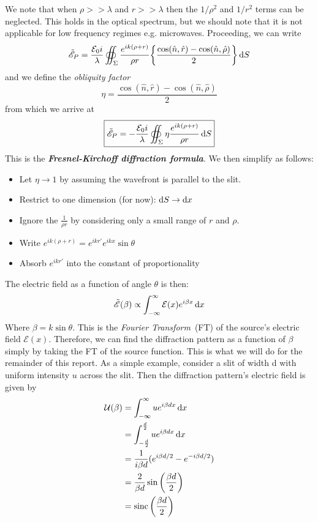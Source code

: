 \documentclass[a4paper,11pt]{article}
\DeclareMathOperator{\sinc}{sinc}
\begin{document}
We note that when $\rho >> \lambda$ and $r >> \lambda$ then the $1/\rho^2$ and $1/r^2$ terms can be neglected. This holds in the optical spectrum, but we should note that it is not applicable for low frequency regimes e.g. microwaves. Proceeding, we can write
\begin{equation}
\tilde{\mathscr{E}}_P = \frac{\mathcal{E}_0i}{\lambda} \displaystyle\oiint_{\Sigma} \frac{e^{ik(\rho+r)}}{\rho r} \bigg\{\frac{\cos(\hat{n},\hat{r})-\cos(\hat{n},\hat{\rho})}{2}\bigg\}\dif S
\end{equation}
and we define the \textit{obliquity factor} 
\begin{equation}
\eta = \frac{\cos(\hat{n},\hat{r})-\cos(\hat{n},\hat{\rho})}{2}
\end{equation}
from which we arrive at 
\begin{equation}
\boxed{\tilde{\mathscr{E}}_P = -\frac{\mathcal{E}_0i}{\lambda} \displaystyle\oiint_{\Sigma} \eta \frac{e^{ik(\rho+r)}}{\rho r} \dif S}
\end{equation}
This is the \textit{\textbf{Fresnel-Kirchoff diffraction formula}}\cite{hecht}. We then simplify as follows:
\begin{itemize}
\item Let $\eta \rightarrow 1$ by assuming the wavefront is parallel to the slit.
\item Restrict to one dimension (for now): $\dif S \rightarrow \dif x$
\item Ignore the $\frac{1}{\rho r}$ by considering only a small range of $r$ and $\rho$.
\item Write $e^{ik(\rho +r)} = e^{ikr'}e^{ikx}\sin\theta$
\item Absorb $e^{ikr'}$ into the constant of proportionality
\end{itemize}
The electric field as a function of angle $\theta$ is then:
\begin{equation}
\tilde{\mathscr{E}}(\beta) \propto \int_{-\infty} ^{\infty} \mathcal{E}(x) e^{i\beta x} \dif x
\end{equation}
Where $\beta = k\sin\theta$.
This is the \textit{Fourier Transform}~(FT) of the source's electric field $\mathcal{E}(x)$. Therefore, we can find the diffraction pattern as a function of $\beta$ simply by taking the FT of the source function. This is what we will do for the remainder of this report. 
As a simple example, consider a slit of width d with uniform intensity $u$ across the slit. Then the diffraction pattern's electric field is given by
\begin{equation*}
\begin{split}
\mathcal{U}(\beta) & = \int_{-\infty}^{\infty} ue^{i\beta dx} \dif x\\
& = \int_{-\frac{d}{2}}^{\frac{d}{2}} ue^{i\beta dx} \dif x \\
& = \frac{1}{i\beta d}(e^{i\beta d/2}-e^{-i\beta d/2})\\
& = \frac{2}{\beta d} \sin\bigg(\frac{\beta d}{2}\bigg)\\
& = \sinc\bigg(\frac{\beta d}{2}\bigg) \\
\end{split}
\end{equation*}
\end{document}
